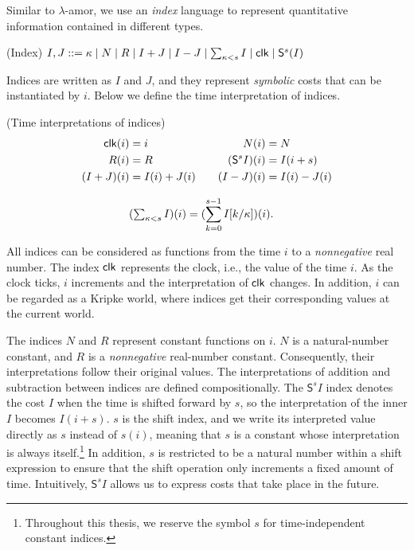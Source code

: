 Similar to $\lambda$-amor, we use an \emph{index} language to represent quantitative information contained in different types.

\begin{defn}(Index)
\label{def:index}
$
  \\
  \begin{aligned}
    I,J ::= {}
    \kappa \mid N \mid R
    \mid I+J \mid I-J
    \mid \textstyle\sum_{\kappa<s} I
    \mid \mathsf{clk}
    \mid \mathsf{S}^s(I)
  \end{aligned}
$
\end{defn}

Indices are written as $I$ and $J$, and they represent \emph{symbolic} costs that can be instantiated by $i$. Below we define the time interpretation of indices.

\begin{defn}(Time interpretations of indices)
\label{def:time-indices}
  \begin{gather*}
    \begin{alignedat}{2}
      \mathsf{clk}(i) &= i
        &\qquad N(i) &= N \\
      R(i) &= R
        &\qquad (\mathsf{S}^s I)(i) &= I(i+s) \\
      (I+J)(i) &= I(i) + J(i)
        &\qquad (I-J)(i) &= I(i) - J(i)
    \end{alignedat}
    \\[0.8em]
    \begin{aligned}
       (\textstyle\sum_{\kappa<s}I)(i)
        &=(\sum_{k=0}^{s-1}I[k/\kappa])(i).
    \end{aligned}
  \end{gather*}
\end{defn}
All indices can be considered as functions from the time 
$i$ to a \emph{nonnegative} real number. The index $\mathsf{clk}$ represents the clock, i.e., the value of the time $i$. As the clock ticks, $i$ 
increments and the interpretation of $\mathsf{clk}$ changes. In addition, $i$ can be regarded as a Kripke world, where indices get their corresponding values at the current world.

The indices $N$ and $R$ represent constant functions on $i$. $N$ is a natural-number constant, and $R$ is a \emph{nonnegative} real-number constant. Consequently, their interpretations follow their original values.
The interpretations of addition and subtraction between indices are defined compositionally.
The $\mathsf{S}^{s}I$ index denotes the cost $I$ when the time is shifted forward by $s$, so the interpretation of the inner $I$ becomes $I(i+s)$.
$s$ is the shift index, and we write its interpreted value directly as $s$ instead of $s(i)$,
meaning that $s$ is a constant whose interpretation is always itself.\footnote{Throughout this thesis, we reserve the symbol $s$ for time-independent constant indices.} In addition, $s$ is restricted to be a natural number within a shift expression to
ensure that the shift operation only increments a fixed amount of time.
Intuitively, $\mathsf{S}^sI$ allows us to express costs that take place in the future.

